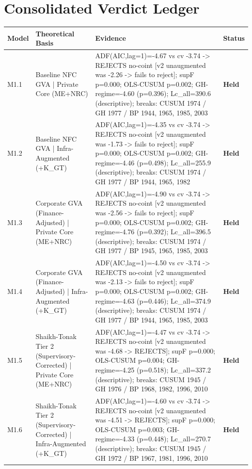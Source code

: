 \documentclass[11pt,a4paper]{article}
\begin{document}
\section{Consolidated Verdict Ledger}
\footnotesize
\begin{longtable}{p{1.1cm}p{3.2cm}p{7.6cm}p{1.4cm}}
\toprule
Model & Theoretical Basis & Evidence & Status \\
\midrule
\endhead
M1.1 & Baseline NFC GVA | Private Core (ME+NRC) & ADF(AIC,lag=1)=-4.67 vs cv -3.74 -> REJECTS no-coint [v2 unaugmented was -2.26 -> fails to reject]; supF p=0.000; OLS-CUSUM p=0.002; GH-regime=-4.60 (p=0.396); Lc\_all=390.6 (descriptive); breaks: CUSUM 1974 / GH 1977 / BP 1944, 1965, 1985, 2003 & \textbf{Held} \\
\addlinespace
M1.2 & Baseline NFC GVA | Infra-Augmented (+K\_GT) & ADF(AIC,lag=1)=-4.35 vs cv -3.74 -> REJECTS no-coint [v2 unaugmented was -1.73 -> fails to reject]; supF p=0.000; OLS-CUSUM p=0.002; GH-regime=-4.46 (p=0.498); Lc\_all=255.9 (descriptive); breaks: CUSUM 1974 / GH 1977 / BP 1944, 1965, 1982 & \textbf{Held} \\
\addlinespace
M1.3 & Corporate GVA (Finance-Adjusted) | Private Core (ME+NRC) & ADF(AIC,lag=1)=-4.90 vs cv -3.74 -> REJECTS no-coint [v2 unaugmented was -2.56 -> fails to reject]; supF p=0.000; OLS-CUSUM p=0.002; GH-regime=-4.76 (p=0.392); Lc\_all=396.5 (descriptive); breaks: CUSUM 1974 / GH 1977 / BP 1945, 1965, 1985, 2003 & \textbf{Held} \\
\addlinespace
M1.4 & Corporate GVA (Finance-Adjusted) | Infra-Augmented (+K\_GT) & ADF(AIC,lag=1)=-4.50 vs cv -3.74 -> REJECTS no-coint [v2 unaugmented was -2.13 -> fails to reject]; supF p=0.000; OLS-CUSUM p=0.002; GH-regime=-4.63 (p=0.446); Lc\_all=374.9 (descriptive); breaks: CUSUM 1974 / GH 1977 / BP 1944, 1965, 1985, 2003 & \textbf{Held} \\
\addlinespace
M1.5 & Shaikh-Tonak Tier 2 (Supervisory-Corrected) | Private Core (ME+NRC) & ADF(AIC,lag=1)=-4.47 vs cv -3.74 -> REJECTS no-coint [v2 unaugmented was -4.68 -> REJECTS]; supF p=0.000; OLS-CUSUM p=0.004; GH-regime=-4.25 (p=0.518); Lc\_all=337.2 (descriptive); breaks: CUSUM 1945 / GH 1976 / BP 1968, 1982, 1996, 2010 & \textbf{Held} \\
\addlinespace
M1.6 & Shaikh-Tonak Tier 2 (Supervisory-Corrected) | Infra-Augmented (+K\_GT) & ADF(AIC,lag=1)=-4.60 vs cv -3.74 -> REJECTS no-coint [v2 unaugmented was -4.51 -> REJECTS]; supF p=0.000; OLS-CUSUM p=0.003; GH-regime=-4.33 (p=0.448); Lc\_all=270.7 (descriptive); breaks: CUSUM 1945 / GH 1972 / BP 1967, 1981, 1996, 2010 & \textbf{Held} \\

\end{longtable}
\end{document}
